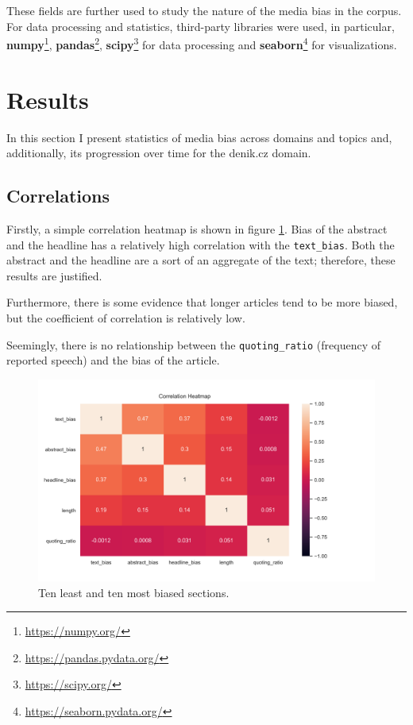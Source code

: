 These fields are further used to study the nature of the media bias in the corpus.
For data processing and statistics, third-party libraries were used, in particular, \textbf{numpy}\footnote{\url{https://numpy.org/}}, \textbf{pandas}\footnote{\url{https://pandas.pydata.org/}}, \textbf{scipy}\footnote{\url{https://scipy.org/}} for data processing and \textbf{seaborn}\footnote{\url{https://seaborn.pydata.org/}} for visualizations.


\section{Results}
In this section I present statistics of media bias across domains and topics and, additionally, its progression over time for the denik.cz domain.

\subsection{Correlations}
Firstly, a simple correlation heatmap is shown in figure \ref{fig:corr}. Bias of the abstract and the headline has a relatively high correlation with the \verb|text_bias|. Both the abstract and the headline are a sort of an aggregate of the text; therefore, these results are justified.

Furthermore, there is some evidence that longer articles tend to be more biased, but the coefficient of correlation is relatively low.

Seemingly, there is no relationship between the \verb|quoting_ratio| (frequency of reported speech)
and the bias of the article.

\begin{figure}

  \includegraphics[scale=0.5]{my_modules/multimedia/inference/corr.png}
  \caption{Ten least and ten most biased sections.}
  \label{fig:corr}

\end{figure}


